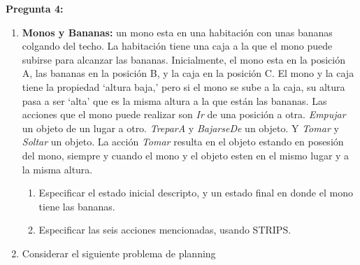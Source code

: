 \documentclass{article}
\begin{document}
\medskip
\textbf{Pregunta 4: } 
\begin{enumerate}

\item \textbf{Monos y Bananas:} un mono esta en una habitaci\'on con unas bananas 
colgando del techo.  La habitaci\'on tiene una caja a la que el mono puede 
subirse para alcanzar las bananas. Inicialmente, el mono esta en la posici\'on A, 
las bananas en la posici\'on B, y la caja en la posici\'on C. El mono y la caja 
tiene la propiedad `altura baja,' pero si el mono se sube a la caja, su 
altura pasa a ser `alta' que es la misma altura a la que est\'an las bananas. 
Las acciones que el mono puede realizar son \emph{Ir} de una posici\'on a otra. 
\emph{Empujar} un objeto de un lugar a otro.  \emph{TreparA} y \emph{BajarseDe}
un objeto. Y \emph{Tomar} y \emph{Soltar} un objeto. La acci\'on \emph{Tomar}
resulta en el objeto estando en posesi\'on del mono, siempre y cuando el mono 
y el objeto esten en el mismo lugar y a la misma altura. 

\begin{enumerate}
\item Especificar el estado inicial descripto, y un estado final en donde el 
mono tiene las bananas. 
\item Especificar las seis acciones mencionadas, usando STRIPS. 
\end{enumerate}

\newpage 
\item Considerar el siguiente problema de planning

\vspace*{-.2cm}
\begin{center}
\end{center}


\end{enumerate}
\end{document}
